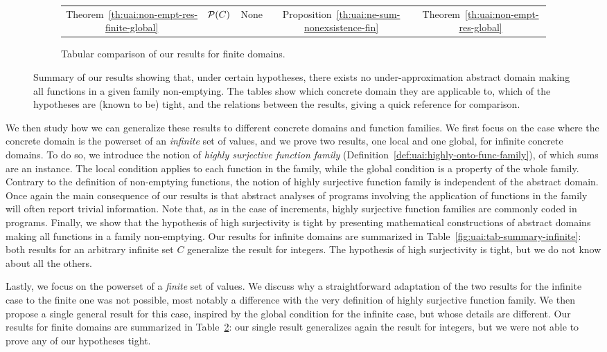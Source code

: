 \begin{figure}[t]
\begin{subfigure}{\textwidth}
\begin{tabular}{c|cccc}
			Theorem~\ref{th:uai:non-empt-res-finite-global}   & $\mathcal{P}(C)$       & None             & Proposition~\ref{th:uai:ne-sum-nonexsistence-fin} & Theorem~\ref{th:uai:non-empt-res-global} \\
		\end{tabular}
		\caption{Tabular comparison of our results for finite domains.}
		\label{fig:uai:tab-summary-finite}
	\end{subfigure}
	\caption{Summary of our results showing that, under certain hypotheses, there exists no under-approximation abstract domain making all functions in a given family non-emptying. The tables show which concrete domain they are applicable to, which of the hypotheses are (known to be) tight, and the relations between the results, giving a quick reference for comparison.}
\end{figure}

We then study how we can generalize these results to different concrete domains and function families.
We first focus on the case where the concrete domain is the powerset of an \emph{infinite} set of values, and we prove two results, one local and one global, for infinite concrete domains. To do so, we introduce the notion of \emph{highly surjective function family} (Definition~\ref{def:uai:highly-onto-func-family}), of which sums are an instance. The local condition applies to each function in the family, while the global condition is a property of the whole family. Contrary to the definition of non-emptying functions, the notion of highly surjective function family is independent of the abstract domain. Once again the main consequence of our results is that abstract analyses of programs involving the application of functions in the family will often report trivial information. Note that, as in the case of increments, highly surjective function families are commonly coded in programs.
Finally, we show that the hypothesis of high surjectivity is tight by presenting mathematical constructions of abstract domains making all functions in a family non-emptying.
Our results for infinite domains are summarized in Table~\ref{fig:uai:tab-summary-infinite}: both results for an arbitrary infinite set $C$ generalize the result for integers. The hypothesis of high surjectivity is tight, but we do not know about all the others.

Lastly, we focus on the powerset of a \emph{finite} set of values. We discuss why a straightforward adaptation of the two results for the infinite case to the finite one was not possible, most notably a difference with the very definition of highly surjective function family. We then propose a single general result for this case, inspired by the global condition for the infinite case, but whose details are different.
Our results for finite domains are summarized in Table~\ref{fig:uai:tab-summary-finite}: our single result generalizes again the result for integers, but we were not able to prove any of our hypotheses tight.


